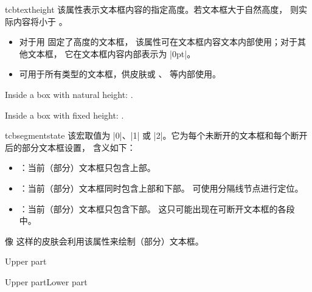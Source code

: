\pagebreak
\begin{docCommand}[doc new=2016-02-16]{tcbtextheight}{}
  该属性表示文本框内容的指定高度。若文本框大于自然高度，
  则实际内容将小于 。
  \begin{itemize}
  \item 对于用  固定了高度的文本框，
    该属性可在文本框内容文本内部使用；对于其他文本框，
    它在文本框内容内部表示为 |0pt|。
  \item {} 可用于所有类型的文本框，供皮肤或
    、 等内部使用。
  \end{itemize}

\begin{dispExample}
\begin{tcolorbox}[enhanced,colframe=blue!75!black,
    underlay={\node[left,red] at (frame.east) {Here: \tcbtextheight};}]
  Inside a box with natural height: \tcbtextheight.
\end{tcolorbox}
\begin{tcolorbox}[enhanced,colframe=blue!75!black,height=1cm,
    underlay={\node[left,red] at (frame.east) {Here: \tcbtextheight};}]
  Inside a box with fixed height: \tcbtextheight.
\end{tcolorbox}
\end{dispExample}
\end{docCommand}


\begin{docCommand}[doc new=2017-04-25]{tcbsegmentstate}{}
  该宏取值为 |0|、|1| 或 |2|。它为每个未断开的文本框和每个断开后的部分文本框设置，
  含义如下：
  \begin{itemize}
    \item{}：当前（部分）文本框只包含上部。
    \item{}：当前（部分）文本框同时包含上部和下部。
      可使用分隔线节点进行定位。
    \item{}：当前（部分）文本框只包含下部。
      这只可能出现在可断开文本框的各段中。
  \end{itemize}
  像  这样的皮肤会利用该属性来绘制（部分）文本框。
\begin{dispExample}
\begin{tcbraster}[raster equal height,enhanced,
    watermark text=\tcbsegmentstate]
  \begin{tcolorbox}Upper part\end{tcolorbox}
  \begin{tcolorbox}Upper part\tcblower Lower part\end{tcolorbox}
\end{tcbraster}
\end{dispExample}
\end{docCommand}
